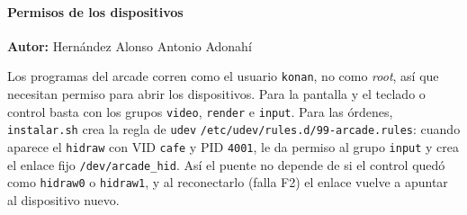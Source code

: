 \paragraph{Permisos de los dispositivos}
\textbf{Autor:} Hernández Alonso Antonio Adonahí

Los programas del arcade corren como el usuario \texttt{konan}, no como \textit{root}, así que necesitan permiso
para abrir los dispositivos. Para la pantalla y el teclado o control basta con los grupos \texttt{video},
\texttt{render} e \texttt{input}. Para las órdenes, \texttt{instalar.sh} crea la regla de \texttt{udev}
\texttt{/etc/udev/rules.d/99-arcade.rules}: cuando aparece el \texttt{hidraw} con VID \texttt{cafe} y PID
\texttt{4001}, le da permiso al grupo \texttt{input} y crea el enlace fijo \texttt{/dev/arcade\_hid}. Así el puente
no depende de si el control quedó como \texttt{hidraw0} o \texttt{hidraw1}, y al reconectarlo (falla F2) el enlace
vuelve a apuntar al dispositivo nuevo.
